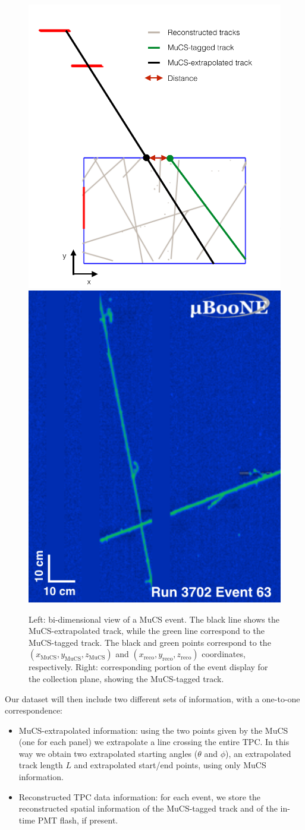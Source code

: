 \documentclass[a4paper]{scrartcl}
\begin{document}
\begin{figure}[htbp]
  \begin{center}
  \includegraphics[width=0.50\linewidth]{figures/evd.pdf}  \vspace{1.8em}\includegraphics[width=0.40\linewidth]{figures/evd_display.png}

  \caption{Left: bi-dimensional view of a MuCS event. The black line shows the MuCS-extrapolated track, while the green line correspond to the MuCS-tagged track. The black and green points correspond to the $(x_{\mathrm{MuCS}},y_{\mathrm{MuCS}},z_{\mathrm{MuCS}})$ and $(x_{\mathrm{reco}},y_{\mathrm{reco}},z_{\mathrm{reco}})$ coordinates, respectively. Right: corresponding portion of the event display for the collection plane, showing the MuCS-tagged track.} \label{fig:evd}
\end{center}
\end{figure}

Our dataset will then include two different sets of information, with a one-to-one correspondence:
\begin{itemize}
  \item MuCS-extrapolated information: using the two points given by the MuCS (one for each panel) we extrapolate a line crossing the entire TPC. In this way we obtain two extrapolated starting angles ($\theta$ and $\phi$), an extrapolated track length $L$ and extrapolated start/end points, using only MuCS information.
  \item Reconstructed TPC data information: for each event, we store the reconstructed spatial information of the MuCS-tagged track and of the in-time PMT flash, if present.
\end{itemize}
\end{document}

